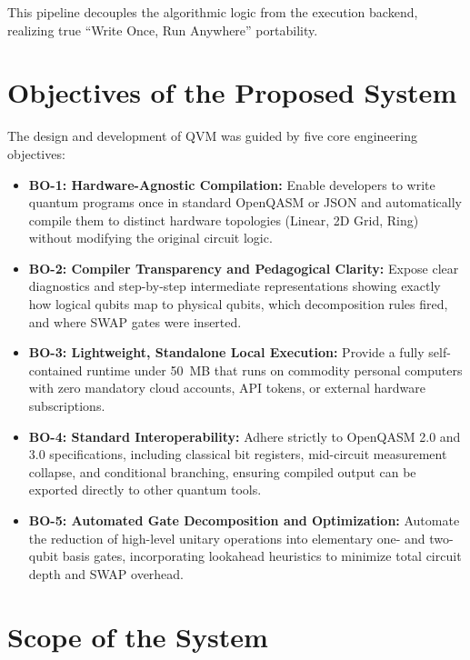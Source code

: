 This pipeline decouples the algorithmic logic from the execution backend, realizing true ``Write Once, Run Anywhere'' portability.


\section{Objectives of the Proposed System}

The design and development of QVM was guided by five core engineering objectives:

\begin{itemize}[leftmargin=*]
    \item \textbf{BO-1: Hardware-Agnostic Compilation:} Enable developers to write quantum programs once in standard OpenQASM or JSON and automatically compile them to distinct hardware topologies (Linear, 2D Grid, Ring) without modifying the original circuit logic.
    \item \textbf{BO-2: Compiler Transparency and Pedagogical Clarity:} Expose clear diagnostics and step-by-step intermediate representations showing exactly how logical qubits map to physical qubits, which decomposition rules fired, and where SWAP gates were inserted.
    \item \textbf{BO-3: Lightweight, Standalone Local Execution:} Provide a fully self-contained runtime under 50~MB that runs on commodity personal computers with zero mandatory cloud accounts, API tokens, or external hardware subscriptions.
    \item \textbf{BO-4: Standard Interoperability:} Adhere strictly to OpenQASM 2.0 and 3.0 specifications, including classical bit registers, mid-circuit measurement collapse, and conditional branching, ensuring compiled output can be exported directly to other quantum tools.
    \item \textbf{BO-5: Automated Gate Decomposition and Optimization:} Automate the reduction of high-level unitary operations into elementary one- and two-qubit basis gates, incorporating lookahead heuristics to minimize total circuit depth and SWAP overhead.
\end{itemize}


\section{Scope of the System}

